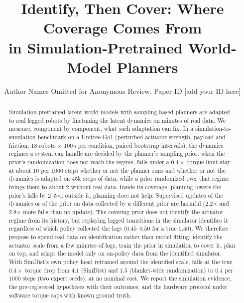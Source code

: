 \documentclass[conference]{IEEEtran}
\begin{document}
\title{Identify, Then Cover: Where Coverage Comes From\\in Simulation-Pretrained World-Model Planners}

\author{Author Names Omitted for Anonymous Review. Paper-ID [add your ID here]}

\maketitle

\begin{abstract}
Simulation-pretrained latent world models with sampling-based planners are adapted to real legged robots by finetuning the latent dynamics on minutes of real data. We measure, component by component, what such adaptation can fix. In a simulation-to-simulation benchmark on a Unitree Go1 (perturbed actuator strength, payload and friction; 18 robots $\times$ 100\,s per condition; paired bootstrap intervals), the dynamics regimes a system can handle are decided by the planner's sampling prior: when the prior's randomization does not reach the regime, falls under a $0.4\times$ torque limit stay at about 10 per 1000 steps whether or not the planner runs and whether or not the dynamics is adapted on 45k steps of data, while a prior randomized over that regime brings them to about 2 without real data. Inside its coverage, planning lowers the prior's falls by 2--5$\times$; outside it, planning does not help. Supervised updates of the dynamics or of the prior on data collected by a different prior are harmful (2.2$\times$ and 2.8$\times$ more falls than no update). The covering prior does not identify the actuator regime from its history, but replaying logged transitions in the simulator identifies it regardless of which policy collected the logs ($0.45$--$0.50$ for a true $0.40$). We therefore propose to spend real data on identification rather than model fitting: identify the actuator scale from a few minutes of logs, train the prior in simulation to cover it, plan on top, and adapt the model only on on-policy data from the identified simulator. With SimDist's own policy head retrained around the identified scale, falls at the true $0.4\times$ torque drop from $4.1$ (SimDist) and $1.5$ (blanket-wide randomization) to $0.4$ per 1000 steps (two expert seeds), at no nominal cost. We report the simulation evidence, the pre-registered hypotheses with their outcomes, and the hardware protocol under software torque caps with known ground truth.
\end{abstract}
\end{document}
